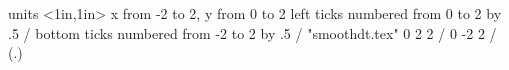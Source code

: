 %
%
\beginpicture
  \setcoordinatesystem units <1in,1in>
  \setplotarea x from -2 to 2, y from 0 to 2
  \axis left  
    ticks numbered from  0 to 2 by .5 /
  \axis bottom  
    ticks numbered from -2 to 2 by .5 /
 \setquadratic
 \plot "smoothdt.tex" 
 \setlinear
  0  2 2 /
  0 -2 2 /
 \setplotsymbol({\rm .})
\endpicture
